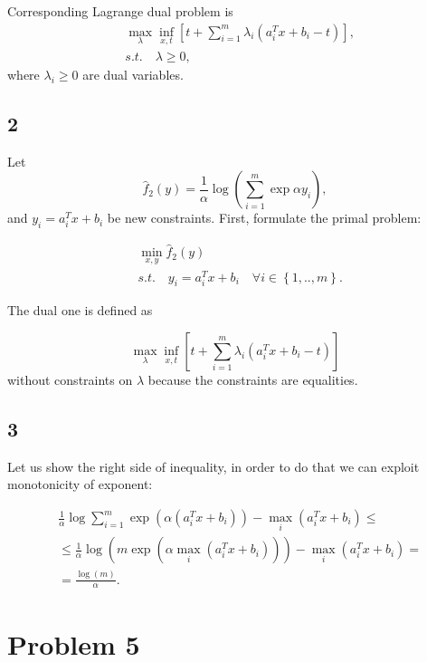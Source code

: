 \documentclass[a4paper,12pt,russian]{extreport}
\begin{document}
Corresponding Lagrange dual problem is
\begin{align*}
&\max_{\lambda} \inf_{x,t} \left[t+ \sum_{i=1}^{m} \lambda_i(a_{i}^Tx + b_i - t)\right],\\
& s.t. \quad \lambda \geq 0,
\end{align*}
where $\lambda_i \geq 0$ are dual variables.

\subsection*{2}

Let 
$$
\hat{f}_2(y)=\frac{1}{\alpha}\log{\left( \sum_{i=1}^m \exp{\alpha y_i}\right)},
$$
and $y_i=a_i^Tx+b_i$ be new constraints. First, formulate the primal problem:

\begin{align*}
& \min_{x,y} \hat{f}_2(y)\\
&s.t. \quad y_i=a_i^Tx+b_i \quad \forall i \in \left\lbrace 1,..,m \right\rbrace.
\end{align*}

The dual one is defined as

$$
\max_{\lambda} \inf_{x,t} \left[t+ \sum_{i=1}^{m} \lambda_i(a_{i}^Tx + b_i - t)\right]
$$
without constraints on $\lambda$ because the constraints are equalities.

\subsection*{3}

Let us show the right side of inequality, in order to do that we can exploit monotonicity of exponent:

\begin{align*}
&\frac{1}{\alpha}\log\sum_{i=1}^m\exp\left(\alpha(a_{i}^Tx+b_i)\right)-\max_{i} (a_{i}^Tx+b_i) \leq \\
&\leq \frac{1}{\alpha}\log\left( m\exp\left(\alpha \max_{i}(a_i^Tx+b_i) \right )\right)-\max_{i} (a_{i}^Tx+b_i)=\\
&= \frac{\log(m)}{\alpha}.
\end{align*}



\section* {Problem 5}
\end{document}
